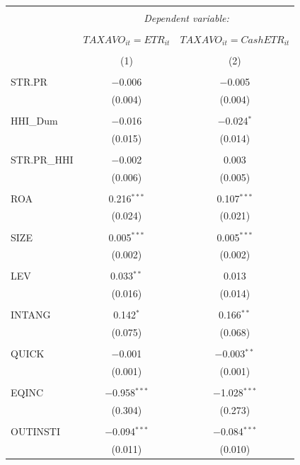\documentclass[a4paper]{article}\usepackage[]{graphicx}\usepackage[]{color}
\begin{document}
\begin{table}[!htbp] \centering 
  \caption{} 
  \label{F2} 
\begin{tabular}{@{\extracolsep{5pt}}lcc} 
\\[-1.8ex]\hline 
\hline \\[-1.8ex] 
 & \multicolumn{2}{c}{\textit{Dependent variable:}} \\ 
\cline{2-3} 
\\[-1.8ex] & $TAXAVO_{it}=ETR_{it}$ & $TAXAVO_{it}=CashETR_{it}$ \\ 
\\[-1.8ex] & (1) & (2)\\ 
\hline \\[-1.8ex] 
 STR.PR & $-$0.006 & $-$0.005 \\ 
  & (0.004) & (0.004) \\ 
  & & \\ 
 HHI\_Dum & $-$0.016 & $-$0.024$^{*}$ \\ 
  & (0.015) & (0.014) \\ 
  & & \\ 
 STR.PR\_HHI & $-$0.002 & 0.003 \\ 
  & (0.006) & (0.005) \\ 
  & & \\ 
 ROA & 0.216$^{***}$ & 0.107$^{***}$ \\ 
  & (0.024) & (0.021) \\ 
  & & \\ 
 SIZE & 0.005$^{***}$ & 0.005$^{***}$ \\ 
  & (0.002) & (0.002) \\ 
  & & \\ 
 LEV & 0.033$^{**}$ & 0.013 \\ 
  & (0.016) & (0.014) \\ 
  & & \\ 
 INTANG & 0.142$^{*}$ & 0.166$^{**}$ \\ 
  & (0.075) & (0.068) \\ 
  & & \\ 
 QUICK & $-$0.001 & $-$0.003$^{**}$ \\ 
  & (0.001) & (0.001) \\ 
  & & \\ 
 EQINC & $-$0.958$^{***}$ & $-$1.028$^{***}$ \\ 
  & (0.304) & (0.273) \\ 
  & & \\ 
 OUTINSTI & $-$0.094$^{***}$ & $-$0.084$^{***}$ \\ 
  & (0.011) & (0.010) \\ 

\end{tabular}
\end{table}
\end{document}
